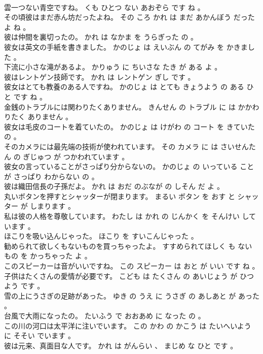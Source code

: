 \documentclass[8pt]{extreport}
\begin{document}
\begin{CJK}{UTF8}{min}
\\	雲一つない青空ですね。	くも ひとつ ない あおぞら です ね 。 
\\	その頃彼はまだ赤ん坊だったよね。	その ころ かれ は まだ あかんぼう だった よ ね 。 
\\	彼は仲間を裏切ったの。	かれ は なかま を うらぎった の 。 
\\	彼女は英文の手紙を書きました。	かのじょ は えいぶん の てがみ を かきました 。 
\\	下流に小さな滝があるよ。	かりゅう に ちいさな たき が ある よ 。 
\\	彼はレントゲン技師です。	かれ は レントゲン ぎし です 。 
\\	彼女はとても教養のある人ですね。	かのじょ は とても きょうよう の ある ひと です ね 。 
\\	金銭のトラブルには関わりたくありません。	きんせん の トラブル に は かかわりたく ありません 。 
\\	彼女は毛皮のコートを着ていたの。	かのじょ は けがわ の コート を きていた の 。 
\\	そのカメラには最先端の技術が使われています。	その カメラ に は さいせんたん の ぎじゅつ が つかわれています 。 
\\	彼女の言っていることがさっぱり分からないの。	かのじょ の いっている こと が さっぱり わからない の 。 
\\	彼は織田信長の子孫だよ。	かれ は おだ のぶなが の しそん だ よ 。 
\\	丸いボタンを押すとシャッターが閉まります。	まるい ボタン を おす と シャッター が しまります 。 
\\	私は彼の人格を尊敬しています。	わたし は かれ の じんかく を そんけい しています 。 
\\	ほこりを吸い込んじゃった。	ほこり を すいこんじゃった 。 
\\	勧められて欲しくもないものを買っちゃったよ。	すすめられてほしく も ない もの を かっちゃった よ 。 
\\	このスピーカーは音がいいですね。	この スピーカー は おと が いい です ね 。 
\\	子供はたくさんの愛情が必要です。	こども は たくさん の あいじょう が ひつよう です 。 
\\	雪の上にうさぎの足跡があった。	ゆき の うえ に うさぎ の あしあと が あった 。 
\\	台風で大雨になったの。	たいふう で おおあめ に なった の 。 
\\	この川の河口は太平洋に注いでいます。	この かわ の かこう は たいへいよう に そそい でいます 。 
\\	彼は元来、真面目な人です。	かれ は がんらい 、 まじめ な ひと です 。 

\end{CJK}
\end{document}
